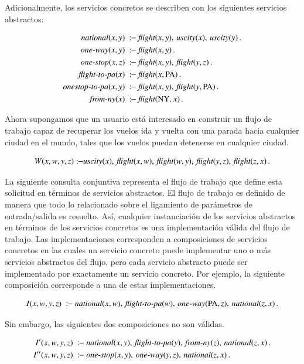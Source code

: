 Adicionalmente, los servicios concretos se describen con los siguientes
servicios abstractos:

\begin{alignat*}{1}
\national(x,y)\   &\qrule\ \flight(x,y),\,\UScity(x),\,\UScity(y)\,. \\
\oneway(x,y)\     &\qrule\ \flight(x,y)\,. \\
\onestop(x,z)\    &\qrule\ \flight(x,y),\,\flight(y,z)\,. \\
\flightPA(x)\     &\qrule\ \flight(x,\PA)\,. \\
\onestopPA(x,y)\  &\qrule\ \flight(x,y),\,\flight(y,\PA)\,. \\
\fromNY(x)\       &\qrule\ \flight(\NY,x)\,.
\end{alignat*}

Ahora supongamos que un usuario está interesado en construir un flujo de trabajo
capaz de recuperar los vuelos ida y vuelta con una parada hacia cualquier ciudad
en el mundo, tales que los vuelos puedan detenerse en cualquier ciudad.

\[ W(x,w,y,z) :\!\!- \text{\it uscity}(x),\,\text{\it flight}(x,w),\,\text{\it flight}(w,y),\,\text{\it flight}(y,z),\,\text{\it flight}(z,x)\,. \]

La siguiente consulta conjuntiva representa el flujo de trabajo que define esta
solicitud en términos de servicios abstractos. El flujo de trabajo es definido
de manera que todo lo relacionado sobre el ligamiento de parámetros de
entrada/salida es resuelto. Así, cualquier instanciación de los servicios
abstractos en términos de los servicios concretos es una implementación válida
del flujo de trabajo. Las implementaciones corresponden a composiciones de
servicios concretos en las cuales un servicio concreto puede implementar uno o
más servicios abstractos del flujo, pero cada servicio abstracto puede ser
implementado por exactamente un servicio concreto. Por ejemplo, la siguiente
composición corresponde a una de estas implementaciones.

\[ I(x,w,y,z)\ \qrule\ \national(x,w),\,\flightPA(w),\,\oneway(\PA,z),\,\national(z,x)\,. \]

Sin embargo, las siguientes dos composiciones no son válidas.

\begin{alignat*}{1}
I'(x,w,y,z)\  \qrule\ &\national(x,y),\,\flightPA(y),\,\fromNY(z),\,\national(z,x)\,. \\
I''(x,w,y,z)\ \qrule\ &\onestop(x,y),\,\oneway(y,z),\,\national(z,x)\,.
\end{alignat*}

